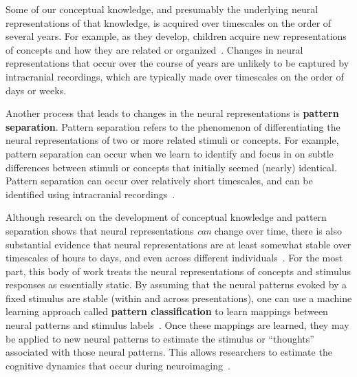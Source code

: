 \documentclass{llmxive}
\begin{document}
Some of our conceptual knowledge, and presumably the underlying neural
representations of that knowledge, is acquired over timescales on the
order of several years.  For example, as they develop, children
acquire new representations of concepts and how they are related or
organized~\citep{KrolSund03, BlayEtal06}.  Changes in neural
representations that occur over the course of years are unlikely to be
captured by intracranial recordings, which are typically made over
timescales on the order of days or weeks.

Another process that leads to changes in the neural representations is
\textbf{pattern separation}.  Pattern separation refers to the
phenomenon of differentiating the neural representations of two or
more related stimuli or concepts.  For example, pattern separation can
occur when we learn to identify and focus in on subtle differences
between stimuli or concepts that initially seemed (nearly) identical.
Pattern separation can occur over relatively short timescales, and can
be identified using intracranial recordings~\citep{LeutEtal07b,
  BakkEtal08, Roll13, YassStar11}.

Although research on the development of conceptual knowledge and
pattern separation shows that neural representations \textit{can}
change over time, there is also substantial evidence that neural
representations are at least somewhat stable over timescales of hours
to days, and even across different individuals~\citep{MitcEtal08a,
  HaxbEtal11, ShinEtal08}.  For the most part, this body of work
treats the neural representations of concepts and stimulus responses
as essentially static.  By assuming that the neural patterns evoked by
a fixed stimulus are stable (within and across presentations), one can
use a machine learning approach called \textbf{pattern classification}
to learn mappings between neural patterns and stimulus
labels~\citep{NormEtal06b}.  Once these mappings are learned, they may
be applied to new neural patterns to estimate the stimulus or
``thoughts'' associated with those neural patterns.  This allows
researchers to estimate the cognitive dynamics that occur during
neuroimaging~\citep{PolyEtal05a, PolyEtal07, GersEtal13, MannEtal16,
  ChiuEtal21}.
\end{document}
